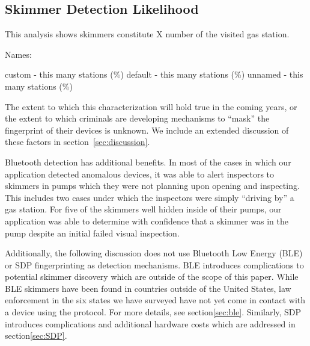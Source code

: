 \subsection{Skimmer Detection Likelihood}
This analysis shows skimmers constitute X number of the visited gas station.

Names:

custom - this many stations (\%)
default - this many stations (\%)
unnamed - this many stations (\%)

The extent to which this characterization will hold true in the coming years, or the extent to which criminals are
developing mechanisms to ``mask'' the fingerprint of their devices is unknown.
%
We include an extended discussion of these factors in section~\ref{sec:discussion}.

Bluetooth detection has additional benefits.
%
In most of the cases in which our application detected anomalous devices, it was able to alert inspectors to skimmers
in pumps which they were not planning upon opening and inspecting.
%
This includes two cases under which the inspectors were simply ``driving by'' a gas station.
%
For five of the skimmers well hidden inside of their pumps, our application was able to determine with confidence
that a skimmer was in the pump despite an initial failed visual inspection.



Additionally, the following discussion does not use Bluetooth Low Energy (BLE) or SDP fingerprinting as detection
mechanisms.
%
BLE introduces complications to potential skimmer discovery which are outside of the scope of this paper.
%
While BLE skimmers have been found in countries outside of the United States, law enforcement in the six states we have
surveyed have not yet come in contact with a device using the protocol.
%
For more details, see section\ref{sec:ble}.
%
Similarly, SDP introduces complications and additional hardware costs which are addressed in section\ref{sec:SDP}.



